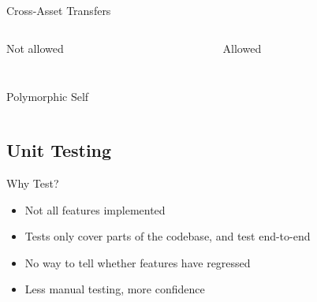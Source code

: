 \documentclass[aspectratio=169]{beamer}
\begin{document}
\begin{frame}{Cross-Asset Transfers}

\begin{columns}
\begin{column}{0.5\textwidth}
  \begin{block}{Not allowed}
    \inputminted{swift}{code/ca-not-allowed.flint}
  \end{block}
\end{column}
\begin{column}{0.5\textwidth}
  \begin{block}{Allowed}
    \inputminted{swift}{code/ca-allowed.flint}
  \end{block}
\end{column}
\end{columns}

\end{frame}

\begin{frame}{Polymorphic Self}
\inputminted{swift}{code/polymorphic-self.flint}
\end{frame}

\subsection{Unit Testing}
\begin{frame}{Why Test?}
\begin{itemize}
    \item Not all features implemented
    \item Tests only cover parts of the codebase, and test end-to-end
    \item No way to tell whether features have regressed
    \item Less manual testing, more confidence
\end{itemize}
\end{frame}
\end{document}
